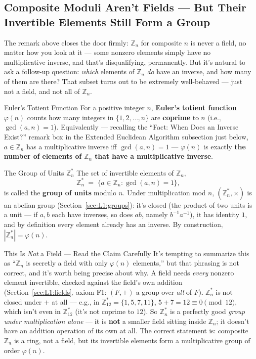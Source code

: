 \subsection{Composite Moduli Aren't Fields --- But Their Invertible Elements Still Form a Group}
\label{sec:L1:composite-moduli-aren-t-fields-but-their}

The remark above closes the door firmly: $\mathbb{Z}_n$ for composite $n$ is never a field, no matter how you look at it --- some nonzero elements simply have no multiplicative inverse, and that's disqualifying, permanently. But it's natural to ask a follow-up question: \emph{which} elements of $\mathbb{Z}_n$ \emph{do} have an inverse, and how many of them are there? That subset turns out to be extremely well-behaved --- just not a field, and not all of $\mathbb{Z}_n$.

\begin{defbox}{Euler's Totient Function}
For a positive integer $n$, \textbf{Euler's totient function} $\varphi(n)$ counts how many integers in $\{1,2,\ldots,n\}$ are \textbf{coprime} to $n$ (i.e., $\gcd(a,n)=1$). Equivalently --- recalling the ``Fact: When Does an Inverse Exist?'' remark box in the Extended Euclidean Algorithm subsection just below, $a\in\mathbb{Z}_n$ has a multiplicative inverse iff $\gcd(a,n)=1$ --- $\varphi(n)$ is exactly \textbf{the number of elements of $\mathbb{Z}_n$ that have a multiplicative inverse}.
\end{defbox}

\begin{defbox}{The Group of Units $\mathbb{Z}_n^*$}
The set of invertible elements of $\mathbb{Z}_n$,
$$
\mathbb{Z}_n^* \;=\; \{a \in \mathbb{Z}_n : \gcd(a,n)=1\},
$$
is called the \textbf{group of units} modulo $n$. Under multiplication mod $n$, $(\mathbb{Z}_n^*, \times)$ is an abelian group (Section~\ref{sec:L1:groups}): it's closed (the product of two units is a unit --- if $a,b$ each have inverses, so does $ab$, namely $b^{-1}a^{-1}$), it has identity $1$, and by definition every element already has an inverse. By construction, $|\mathbb{Z}_n^*| = \varphi(n)$.
\end{defbox}

\begin{rmkbox}{This Is \emph{Not} a Field --- Read the Claim Carefully}
It's tempting to summarize this as ``$\mathbb{Z}_n$ is secretly a field with only $\varphi(n)$ elements,'' but that phrasing is not correct, and it's worth being precise about why. A field needs \emph{every} nonzero element invertible, checked against the field's own addition (Section~\ref{sec:L1:fields}, axiom F1: $(F,+)$ a group over \emph{all} of $F$). $\mathbb{Z}_n^*$ is not closed under $+$ at all --- e.g., in $\mathbb{Z}_{12}^* = \{1,5,7,11\}$, $5+7=12\equiv 0 \pmod{12}$, which isn't even in $\mathbb{Z}_{12}^*$ (it's not coprime to $12$). So $\mathbb{Z}_n^*$ is a perfectly good \emph{group under multiplication alone} --- it is \textbf{not} a smaller field sitting inside $\mathbb{Z}_n$; it doesn't have an addition operation of its own at all. The correct statement is: composite $\mathbb{Z}_n$ is a ring, not a field, but its invertible elements form a multiplicative group of order $\varphi(n)$.
\end{rmkbox}

